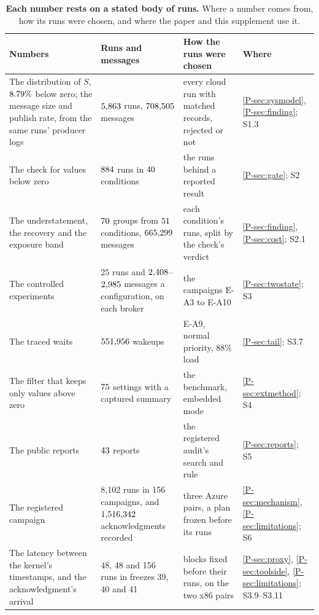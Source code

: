 \documentclass[10pt,journal,onecolumn]{IEEEtran}
\begin{document}
\begin{table}[tb]
\caption{\textbf{Each number rests on a stated body of runs.} Where a number comes from, how its
runs were chosen, and where the paper and this supplement use it.}
\label{stab:provenance}
\centering
\footnotesize
\begin{tabular}{@{}p{}p{}p{}>{\raggedright\arraybackslash}p{}@{}}
\toprule
Numbers & Runs and messages & How the runs were chosen & Where \\
\midrule
The distribution of $S$, $8.79\%$ below zero; the message size and publish rate, from
the same runs' producer logs & $5{,}863$ runs, $708{,}505$ messages & every cloud run with
matched records, rejected or not & \ref{P-sec:sysmodel}, \ref{P-sec:finding}; S1.3 \\
The check for values below zero & $884$ runs in $40$ conditions & the runs behind
a reported result & \ref{P-sec:gate}; S2 \\
The understatement, the recovery and the exposure band & $70$ groups from
$51$ conditions, $665{,}299$ messages & each condition's runs, split
by the check's verdict & \ref{P-sec:finding}, \ref{P-sec:cost}; S2.1 \\
The controlled experiments & $25$ runs and $2{,}408$--$2{,}985$ messages a configuration, on
each broker & the campaigns E-A3 to E-A10 & \ref{P-sec:twostate}; S3 \\
The traced waits & $551{,}956$ wakeups & E-A9, normal priority, $88\%$ load & \ref{P-sec:tail};
S3.7 \\
The filter that keeps only values above zero & $75$ settings with a captured summary & the benchmark,
embedded mode & \ref{P-sec:extmethod}; S4 \\
The public reports & $43$ reports & the registered audit's search and rule & \ref{P-sec:reports};
S5 \\
The registered campaign & 8,102 runs in 156 campaigns, and $1{,}516{,}342$ acknowledgments
recorded & three Azure pairs, a plan frozen before its runs & \ref{P-sec:mechanism}, \ref{P-sec:limitations}; S6 \\
The latency between the kernel's timestamps, and the acknowledgment's arrival & 48, 48 and 156 runs in freezes 39, 40
and 41 & blocks fixed before their runs, on the two x86 pairs & \ref{P-sec:proxy}, \ref{P-sec:toolside}, \ref{P-sec:limitations}; S3.9--S3.11 \\
\bottomrule
\end{tabular}
\end{table}
\end{document}
